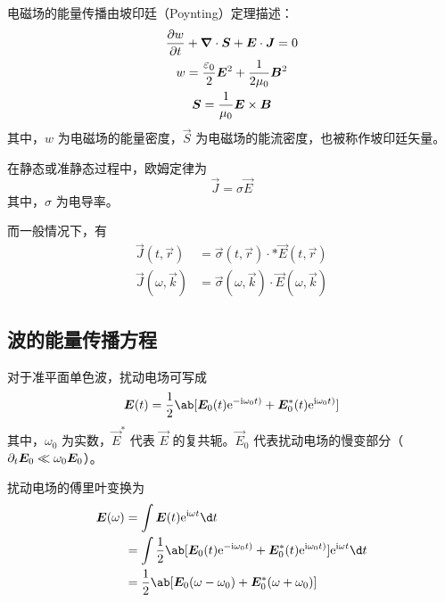电磁场的能量传播由坡印廷（Poynting）定理描述：
\begin{subequations}\begin{gather}
\pdv{w}{t} + \bm{\nabla} \cdot{\bm{S}} + \bm{E} \cdot \bm{J} = 0 \\
w = \frac{\varepsilon_0}{2} \bm{E}^2 + \frac{1}{2\mu_0} \bm{B}^2 \\
\bm{S} = \frac{1}{\mu_0} \bm{E} \times \bm{B}
\end{gather}\end{subequations}
其中，$w$ 为电磁场的能量密度，$\vec{S}$ 为电磁场的能流密度，也被称作坡印廷矢量。

在静态或准静态过程中，欧姆定律为
\begin{equation}
\vec{J} = \sigma \vec{E}
\end{equation}
其中，$\sigma$ 为电导率。

而一般情况下，有
\begin{equation}\begin{aligned}
\vec{J}(t, \vec{r}) &= \vec{\sigma}(t, \vec{r}) \cdot * \vec{E}(t, \vec{r}) \\
\vec{J}(\omega, \vec{k}) &= \vec{\sigma}(\omega, \vec{k}) \cdot \vec{E}(\omega, \vec{k})
\end{aligned}\end{equation}

\subsection{波的能量传播方程}

对于准平面单色波，扰动电场可写成
\begin{equation}
\vec{E}(t) = \frac{1}{2} \ab[
    \vec{E}_0(t) \eu^{-\im\omega_0 t)}
  + \vec{E}_0^*(t) \eu^{\im\omega_0 t)}
]
\end{equation}
其中，$\omega_0$ 为实数，$\vec{E}^*$ 代表 $\vec{E}$ 的复共轭。$\vec{E}_0$ 代表扰动电场的慢变部分（$\pdv{\bm{E}_0}!{t}\ll\omega_0\bm{E}_0$）。

扰动电场的傅里叶变换为
\begin{equation}\begin{aligned}
\vec{E}(\omega) &= \int \vec{E}(t) \eu^{\im \omega t} \d t \\
&= \int \frac{1}{2} \ab[
    \vec{E}_0(t) \eu^{-\im\omega_0 t)}
  + \vec{E}_0^*(t) \eu^{\im\omega_0 t)}
] \eu^{\im \omega t} \d t \\
&= \frac{1}{2} \ab[
    \vec{E}_0(\omega - \omega_0)
  + \vec{E}_0^*(\omega + \omega_0)
]
\end{aligned}\end{equation}

